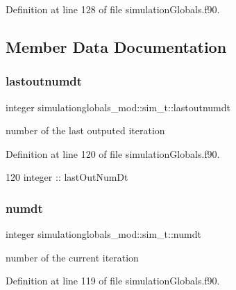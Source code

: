 Definition at line 128 of file simulation\+Globals.\+f90.



\subsection{Member Data Documentation}
\mbox{\label{structsimulationglobals__mod_1_1sim__t_a09270b8350c388b420492cd2209bb1dd}} 
\subsubsection{\texorpdfstring{lastoutnumdt}{lastoutnumdt}}
{\footnotesize\ttfamily integer simulationglobals\+\_\+mod\+::sim\+\_\+t\+::lastoutnumdt\hspace{0.3cm}{\ttfamily [private]}}



number of the last outputed iteration 



Definition at line 120 of file simulation\+Globals.\+f90.


\begin{DoxyCode}
120         \textcolor{keywordtype}{integer} :: lastOutNumDt
\end{DoxyCode}
\mbox{\label{structsimulationglobals__mod_1_1sim__t_acf2dd4822ebd48541ac6d018038b286a}} 
\subsubsection{\texorpdfstring{numdt}{numdt}}
{\footnotesize\ttfamily integer simulationglobals\+\_\+mod\+::sim\+\_\+t\+::numdt\hspace{0.3cm}{\ttfamily [private]}}



number of the current iteration 



Definition at line 119 of file simulation\+Globals.\+f90.


